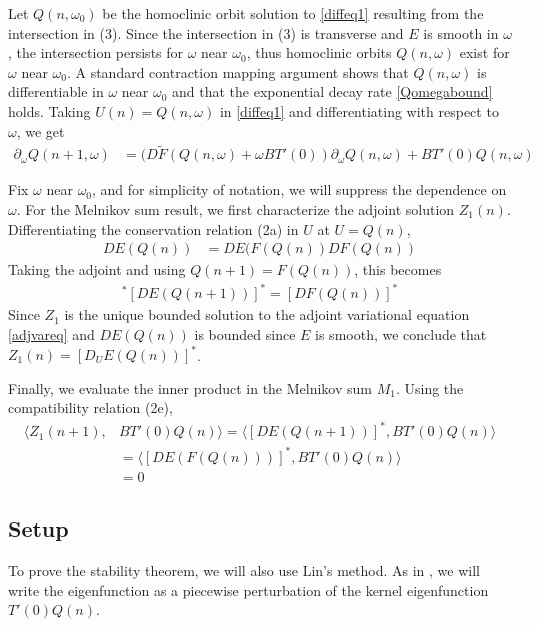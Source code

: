\documentclass[12pt]{article}
\begin{document}
Let $Q(n, \omega_0)$ be the homoclinic orbit solution to \eqref{diffeq1} resulting from the intersection in (3). Since the intersection in (3) is transverse and $E$ is smooth in $\omega$, the intersection persists for $\omega$ near $\omega_0$, thus homoclinic orbits $Q(n, \omega)$ exist for $\omega$ near $\omega_0$. A standard contraction mapping argument shows that $Q(n, \omega)$ is differentiable in $\omega$ near $\omega_0$ and that the exponential decay rate \eqref{Qomegabound} holds. Taking $U(n) = Q(n, \omega)$ in \eqref{diffeq1} and differentiating with respect to $\omega$, we get
\begin{align*}
\partial_\omega Q(n+1, \omega) &=
(D\tilde{F}(Q(n, \omega) + \omega B T'(0)) \partial_\omega Q(n, \omega) + B T'(0) Q(n, \omega)
\end{align*}

Fix $\omega$ near $\omega_0$, and for simplicity of notation, we will suppress the dependence on $\omega$. For the Melnikov sum result, we first characterize the adjoint solution $Z_1(n)$. Differentiating the conservation relation (2a) in $U$ at $U = Q(n)$,
\begin{align*}
DE(Q(n)) &= DE(F(Q(n)) DF(Q(n))
\end{align*}
Taking the adjoint and using $Q(n+1) = F(Q(n))$, this becomes
\begin{align*}
[DF(Q(n))]^* [DE(Q(n+1))]^* = [DF(Q(n))]^*
\end{align*}
Since $Z_1$ is the unique bounded solution to the adjoint variational equation \eqref{adjvareq} and $DE(Q(n))$ is bounded since $E$ is smooth, we conclude that $Z_1(n) = [D_U E( Q(n) )]^*$.

Finally, we evaluate the inner product in the Melnikov sum $M_1$. Using the compatibility relation (2e),
\begin{align*}
\langle Z_1(n + 1), &BT'(0) Q(n) \rangle
= \langle [D E(Q(n+1))]^*, BT'(0) Q(n) \rangle \\
&= \langle [D E(F(Q(n)))]^*, BT'(0) Q(n) \rangle \\
&= 0
\end{align*}

\subsection{Setup}

To prove the stability theorem, we will also use Lin's method. As in \cite{Sandstede1998}, we will write the eigenfunction as a piecewise perturbation of the kernel eigenfunction $T'(0)Q(n)$. 
\end{document}
